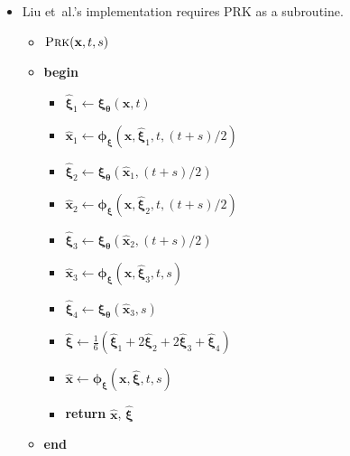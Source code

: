 \documentclass[10pt]{article}
\newcommand{\ve}[1]{\mathbf{#1}}
\newcommand{\ves}[1]{\boldsymbol{#1}}
\newcommand{\etal}{{et~al.}}
\begin{document}
\begin{itemize}
  \item Liu \etal's implementation requires PRK as a subroutine.
  \begin{itemize}
    \item[] $\textsc{Prk}(\ve{x}, t, s)$
    \item[] {\bf begin}
    \begin{itemize}
      \item[] $\widehat{\ves{\xi}}_1 \leftarrow \ves{\xi}_{\ves{\theta}}(\ve{x}, t)$
      \item[] $\widehat{\ve{x}}_1 \leftarrow \ves{\phi}_{\ves{\xi}}(\ve{x}, \widehat{\ves{\xi}}_1, t, (t+s)/2)$
      \item[] $\widehat{\ves{\xi}}_2 \leftarrow \ves{\xi}_{\ves{\theta}}(\widehat{\ve{x}}_1, (t+s)/2)$
      \item[] $\widehat{\ve{x}}_2 \leftarrow \ves{\phi}_{\ves{\xi}}(\ve{x}, \widehat{\ves{\xi}}_2, t, (t+s)/2)$
      \item[] $\widehat{\ves{\xi}}_3 \leftarrow \ves{\xi}_{\ves{\theta}}(\widehat{\ve{x}}_2, (t+s)/2)$
      \item[] $\widehat{\ve{x}}_3 \leftarrow \ves{\phi}_{\ves{\xi}}(\ve{x}, \widehat{\ves{\xi}}_3, t, s)$
      \item[] $\widehat{\ves{\xi}}_4 \leftarrow \ves{\xi}_{\ves{\theta}}(\widehat{\ve{x}}_3, s)$
      \item[] $\widehat{\ves{\xi}} \leftarrow \frac{1}{6}(\widehat{\ves{\xi}}_1 + 2\widehat{\ves{\xi}}_2 + 2 \widehat{\ves{\xi}}_3 + \widehat{\ves{\xi}}_4)$
      \item[] $\widehat{\ve{x}} \leftarrow \ves{\phi}_{\ves{\xi}}(\ve{x}, \widehat{\ves{\xi}}, t, s)$
      \item[] {\bf return} $\widehat{\ve{x}}$, $\widehat{\ves{\xi}}$
    \end{itemize}
    \item[] {\bf end}
  \end{itemize}


\end{itemize}
\end{document}
